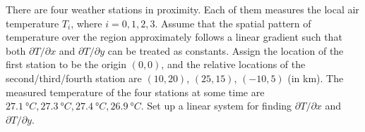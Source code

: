 \begin{exmp}
\label{exmp:weatherstats}
There are four weather stations in proximity. Each of them measures the local air temperature $T_i$, where $i = 0,1,2,3$. Assume that the spatial pattern of temperature over the region approximately follows a linear gradient such that both $\partial T/\partial x$ and $\partial T/\partial y$ can be treated as constants. Assign the location of the first station to be the origin $(0,0)$, and the relative locations of the second/third/fourth station are $(10,20)$, $(25,15)$, $(-10,5)$ (in \si{\km}). The measured temperature of the four stations at some time are $\SI{27.1}{\degree C}, \SI{27.3}{\degree C}, \SI{27.4}{\degree C}, \SI{26.9}{\degree C}$. Set up a linear system for finding $\partial T/\partial x$ and $\partial T/\partial y$.
\end{exmp}
